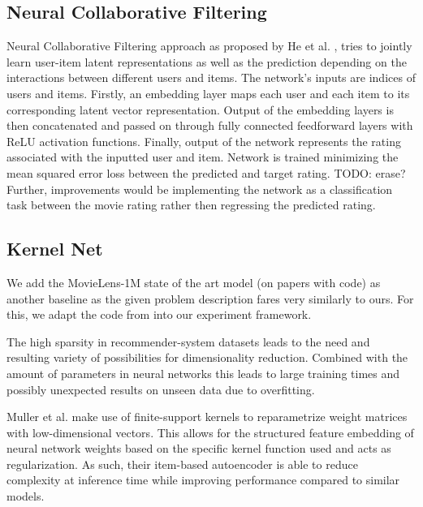 \documentclass[10pt,conference,compsocconf]{IEEEtran}
\begin{document}
    \subsection{Neural Collaborative Filtering}
    Neural Collaborative Filtering approach as proposed by He et al. \cite{DBLP:journals/corr/abs-1708-05031}, tries to
    jointly learn user-item latent representations as well as the prediction depending on the interactions between
    different users and items. The network's inputs are indices of users and items. Firstly, an embedding layer maps
    each user and each item to its corresponding latent vector representation. Output of the embedding layers is then
    concatenated and passed on through fully connected feedforward layers with ReLU activation functions. Finally,
    output of the network represents the rating associated with the inputted user and item. Network is trained minimizing
    the mean squared error loss between the predicted and target rating. TODO: erase? Further, improvements would be
    implementing the network as a classification task between the movie rating rather then regressing the predicted rating.

    \subsection{Kernel Net}
    We add the MovieLens-1M state of the art model (on papers with code) as another baseline as the given problem description fares very similarly to ours.
    For this, we adapt the code from \cite{pmlr-v80-muller18a, kernelNetGithub} into our experiment framework.

    The high sparsity in recommender-system datasets leads to the need and resulting variety of possibilities for dimensionality reduction.
    Combined with the amount of parameters in neural networks this leads to large training times and possibly
    unexpected results on unseen data due to overfitting.

    Muller et al. make use of finite-support kernels to reparametrize weight matrices with low-dimensional vectors.
    This allows for the structured feature embedding of neural network weights based on the specific kernel function used and
    acts as regularization.
    As such, their item-based autoencoder is able to reduce complexity at inference time while improving performance compared to similar models.\cite{pmlr-v80-muller18a}
\end{document}
